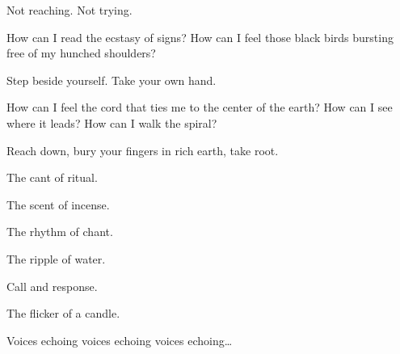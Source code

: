\begin{paracol}{2}
\begin{leftcolumn}
\begin{ally}
Not reaching. Not trying.
\end{ally}
\noindent How can I read the ecstasy of signs? How can I feel those black birds bursting free of my hunched shoulders?

\begin{ally}
Step beside yourself. Take your own hand.
\end{ally}
\noindent How can I feel the cord that ties me to the center of the earth? How can I see where it leads? How can I walk the spiral?

\begin{ally}
Reach down, bury your fingers in rich earth, take root.
\end{ally}
\noindent The cant of ritual.

\begin{ally}
The scent of incense.
\end{ally}
\noindent The rhythm of chant.

\begin{ally}
The ripple of water.
\end{ally}
\noindent Call and response.

\begin{ally}
The flicker of a candle.
\end{ally}
\noindent Voices echoing voices echoing voices echoing\ldots{}


\end{leftcolumn}
\end{paracol}

